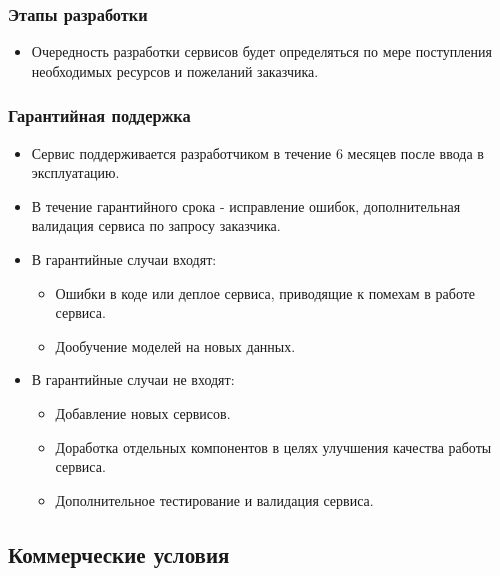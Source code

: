 \documentclass[12pt]{article}
\begin{document}
\subsubsection{Этапы разработки}
\begin{itemize}
	\item Очередность разработки сервисов будет определяться по мере поступления необходимых ресурсов и пожеланий заказчика.
\end{itemize}

\subsubsection{Гарантийная поддержка}
\begin{itemize}
	\item Сервис поддерживается разработчиком в течение 6 месяцев после ввода в эксплуатацию.
	\item В течение гарантийного срока - исправление ошибок, дополнительная валидация сервиса по запросу заказчика.
	\item В гарантийные случаи входят:
	      \begin{itemize}
		      \item Ошибки в коде или деплое сервиса, приводящие к помехам в работе сервиса.
		      \item Дообучение моделей на новых данных.
	      \end{itemize}
	\item В гарантийные случаи не входят:
	      \begin{itemize}
		      \item Добавление новых сервисов.
		      \item Доработка отдельных компонентов в целях улучшения качества работы сервиса.
		      \item Дополнительное тестирование и валидация сервиса.
	      \end{itemize}
\end{itemize}

\subsection{Коммерческие условия}
\end{document}
